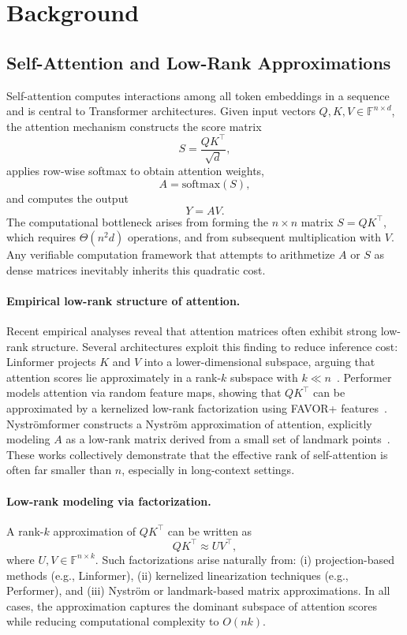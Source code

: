 \documentclass[11pt]{article}
\begin{document}
\section{Background}

\subsection{Self-Attention and Low-Rank Approximations}

Self-attention computes interactions among all token embeddings in a 
sequence and is central to Transformer architectures.  
Given input vectors 
$Q, K, V \in \mathbb{F}^{n \times d}$,  
the attention mechanism constructs the score matrix
\[
  S = \frac{Q K^\top}{\sqrt{d}},
\]
applies row-wise softmax to obtain attention weights,
\[
  A = \mathrm{softmax}(S),
\]
and computes the output
\[
  Y = A V.
\]
The computational bottleneck arises from forming the $n \times n$ matrix 
$S = Q K^\top$, which requires $\Theta(n^2 d)$ operations, and from 
subsequent multiplication with $V$.
Any verifiable computation framework that attempts to arithmetize 
$A$ or $S$ as dense matrices inevitably inherits this quadratic cost.

\vspace{0.7em}
\paragraph{Empirical low-rank structure of attention.}
Recent empirical analyses reveal that attention matrices 
often exhibit strong low-rank structure.  
Several architectures exploit this finding to reduce inference cost:  
Linformer projects $K$ and $V$ into a lower-dimensional subspace, 
arguing that attention scores lie approximately in a 
rank-$k$ subspace with $k \ll n$~\cite{wang2020linformer}.  
Performer models attention via random feature maps, showing that 
$Q K^\top$ can be approximated by a kernelized low-rank factorization 
using FAVOR+ features~\cite{choromanski2021performer}.  
Nystr\"omformer constructs a Nystr\"om approximation of attention, 
explicitly modeling $A$ as a low-rank matrix derived from a small set of 
landmark points~\cite{xiong2021nystromformer}.  
These works collectively demonstrate that the effective rank of 
self-attention is often far smaller than $n$, especially in long-context settings.

\vspace{0.7em}
\paragraph{Low-rank modeling via factorization.}
A rank-$k$ approximation of $QK^\top$ can be written as
\[
  Q K^\top \approx U V^\top,
\]
where $U, V \in \mathbb{F}^{n \times k}$.
Such factorizations arise naturally from:
(i) projection-based methods (e.g., Linformer),  
(ii) kernelized linearization techniques (e.g., Performer), and  
(iii) Nystr\"om or landmark-based matrix approximations.  
In all cases, the approximation captures the dominant subspace of 
attention scores while reducing computational complexity to $O(n k)$.
\end{document}
